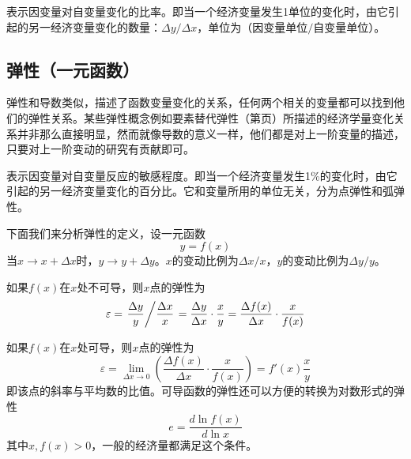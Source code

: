 \begin{Definition}
表示因变量对自变量变化的比率。即当一个经济变量发生1单位的变化时，由它引起的另一经济变量变化的数量：$\Delta y / \Delta x$，单位为（因变量单位$/$自变量单位）。
\end{Definition}

\subsection{弹性（一元函数）}
\label{sec:single-math-elasticity}

弹性和导数类似，描述了函数变量变化的关系，任何两个相关的变量都可以找到他们的弹性关系。某些弹性概念例如要素替代弹性（第\pageref{subsec:elasticity-of-substitution}页）所描述的经济学量变化关系并非那么直接明显，然而就像导数的意义一样，他们都是对上一阶变量的描述，只要对上一阶变动的研究有贡献即可。

\begin{Definition}[弹性]
表示因变量对自变量反应的敏感程度。即当一个经济变量发生1\%的变化时，由它引起的另一经济变量变化的百分比。它和变量所用的单位无关，分为点弹性和弧弹性。
\end{Definition}

下面我们来分析弹性的定义，设一元函数
\[
y=f(x)
\]
当$x \to x + \Delta x$时，$y \to y + \Delta y$。$x$的变动比例为$\Delta x /x$，$y$的变动比例为$\Delta y/y$。

如果$f(x)$在$x$处不可导，则$x$点的弹性为
\begin{equation}
\varepsilon=\left. {\frac{{\Delta y}}{y}} \middle/ {\frac{{\Delta x}}{x}} \right.= \frac{\Delta y}{\Delta x} \cdot \frac{x}{y}=\frac{\Delta f(x)}{\Delta x} \cdot \frac{x}{f(x)}
\label{eq:arc-elasticity-of-general-function}
\end{equation}

如果$f(x)$在$x$处可导，则$x$点的弹性为
\begin{equation}
\varepsilon = \mathop {\lim }\limits_{\Delta x \to 0} (\frac{{\Delta f(x)}}{{\Delta x}}\cdot\frac{x}{{f(x)}}) = f'(x)\frac{x}{y}
\label{eq:point-elasticity-of-general-function}
\end{equation}
即该点的斜率与平均数的比值。可导函数的弹性还可以方便的转换为对数形式的弹性
\begin{equation}
e = \frac{d \ln f(x)}{d \ln x}
\label{eq:point-elasticity-of-general-function-ln-form}
\end{equation}
其中$x, f(x) > 0$，一般的经济量都满足这个条件。

